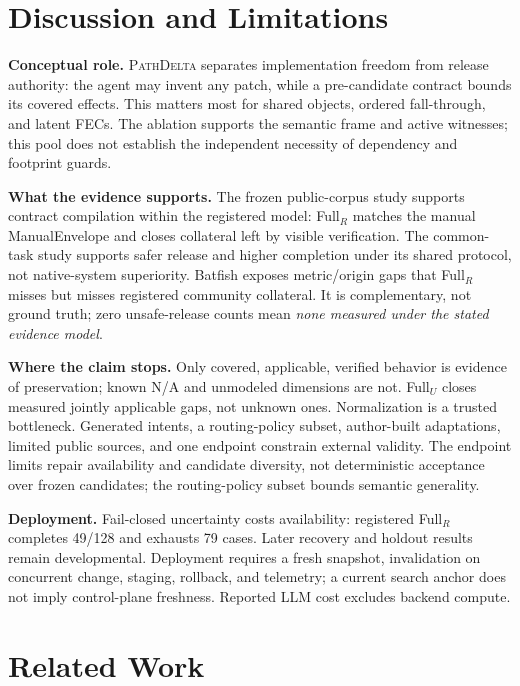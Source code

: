\documentclass[conference]{IEEEtran}
\newcommand{\system}{\textsc{PathDelta}\xspace}
\newcommand{\na}{\textsc{N/A}\xspace}
\begin{document}

\section{Discussion and Limitations}

\textbf{Conceptual role.}  \system separates implementation freedom from
release authority: the agent may invent any patch, while a pre-candidate
contract bounds its covered effects.  This matters most for shared objects,
ordered fall-through, and latent FECs.  The ablation supports the semantic frame
and active witnesses; this pool does not establish the independent necessity of
dependency and footprint guards.

\textbf{What the evidence supports.}  The frozen public-corpus study supports
contract compilation within the registered model: Full$_R$ matches the manual
ManualEnvelope and closes collateral left by visible verification.  The
common-task study supports safer release and higher completion under its shared
protocol, not native-system superiority.  Batfish exposes metric/origin gaps
that Full$_R$ misses but misses registered community collateral.  It is
complementary, not ground truth; zero unsafe-release counts mean \emph{none
measured under the stated evidence model}.

\textbf{Where the claim stops.}  Only covered, applicable, verified behavior is
evidence of preservation; known \na and unmodeled dimensions are not.  Full$_U$
closes measured jointly applicable gaps, not unknown ones.  Normalization is a
trusted bottleneck.  Generated intents, a routing-policy subset, author-built
adaptations, limited public sources, and one endpoint constrain external
validity.  The endpoint limits repair availability and candidate diversity,
not deterministic acceptance over frozen candidates; the routing-policy subset
bounds semantic generality.

\textbf{Deployment.}  Fail-closed uncertainty costs availability: registered
Full$_R$ completes 49/128 and exhausts 79 cases.  Later recovery and holdout
results remain developmental.  Deployment requires a fresh snapshot,
invalidation on concurrent change, staging, rollback, and telemetry; a current
search anchor does not imply control-plane freshness.  Reported LLM cost
excludes backend compute.

\section{Related Work}
\end{document}
